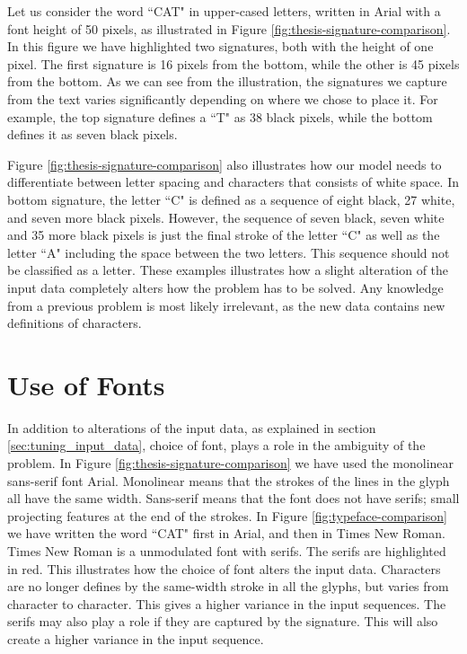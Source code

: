 Let us consider the word ``CAT" in upper-cased letters, written in Arial with a font height of 50 pixels, as illustrated in Figure \ref{fig:thesis-signature-comparison}. In this figure we have highlighted two signatures, both with the height of one pixel. The first signature is 16 pixels from the bottom, while the other is 45 pixels from the bottom. As we can see from the illustration, the signatures we capture from the text varies significantly depending on where we chose to place it. For example, the top signature defines a ``T" as 38 black pixels, while the bottom defines it as seven black pixels.

Figure \ref{fig:thesis-signature-comparison} also illustrates how our model needs to differentiate between letter spacing and characters that consists of white space. In bottom signature, the letter ``C" is defined as a sequence of eight black, 27 white, and seven more black pixels. However, the sequence of seven black, seven white and 35 more black pixels is just the final stroke of the letter ``C" as well as the letter ``A" including the space between the two letters. This sequence should not be classified as a letter. These examples illustrates how a slight alteration of the input data completely alters how the problem has to be solved. Any knowledge from a previous problem is most likely irrelevant, as the new data contains new definitions of characters.


\section{Use of Fonts}
In addition to alterations of the input data, as explained in section \ref{sec:tuning_input_data}, choice of font, plays a role in the ambiguity of the problem. In Figure \ref{fig:thesis-signature-comparison} we have used the monolinear sans-serif font Arial. Monolinear means that the strokes of the lines in the glyph all have the same width. Sans-serif means that the font does not have serifs; small projecting features at the end of the strokes. In Figure \ref{fig:typeface-comparison} we have written the word ``CAT" first in Arial, and then in Times New Roman. Times New Roman is a unmodulated font with serifs. The serifs are highlighted in red. This illustrates how the choice of font alters the input data. Characters are no longer defines by the same-width stroke in all the glyphs, but varies from character to character. This gives a higher variance in the input sequences. The serifs may also play a role if they are captured by the signature. This will also create a higher variance in the input sequence.

